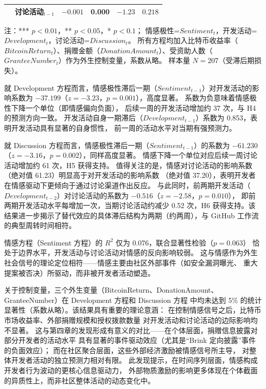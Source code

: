 \documentclass[
    type = master, %
    degree = professional,        %
    decl-page,  %
    twoside,                %
    fontset = fandol %
  ]{njuthesis}
\begin{document}
\begin{table}[htbp]
\begin{tabularx}{\textwidth}{p{3.2cm}p{3.2cm}XXXX}
                      & 讨论活动$_{t-1}$   & $-0.001$ & 0.000 & $-1.23$ & $0.218$ \\
        \bottomrule
    \end{tabularx}
    \begin{minipage}{\textwidth}
        \vspace{0.3em}
        \footnotesize 注：*** $p < 0.01$，** $p < 0.05$，* $p < 0.1$；
              情感极性=$Sentiment_t$，开发活动=$Development_t$，讨论活动=$Discussion_t$。
              所有方程均加入比特币收益率（$BitcoinReturn_t$）、捐赠金额（$DonationAmount_t$）、受资助人数（$GranteeNumber_t$）作为外生控制变量，系数从略。
              样本量 $N = 207$（受滞后期损失）。
    \end{minipage}
\end{table}

就 Development 方程而言，情感极性滞后一期（$Sentiment_{t-1}$）对开发活动的影响系数为
$-37.199$（$z = -3.23$，$p = 0.001$），高度显著。
系数为负意味着情感极性下降一个单位（即情感偏向负面），
后续一周的开发活动增加约 37 次，与 H4 的预测方向一致。
开发活动自身一期滞后（$Development_{t-1}$）系数为 0.853，表明开发活动具有显著的自身惯性，
前一周的活动水平对当期有强预测力。

就 Discussion 方程而言，情感极性滞后一期（$Sentiment_{t-1}$）的系数为
$-61.230$（$z = -3.16$，$p = 0.002$），同样高度显著。
情感下降一个单位对应后续一周讨论活动增加约 61 次，H5 获得支持。
值得关注的是，情感对讨论活动的影响系数（绝对值 61.23）明显高于对开发活动的影响系数
（绝对值 37.20），表明开发者在情感驱动下更倾向于通过讨论渠道作出反应。
与此同时，前两期开发活动（$Development_{t-2}$）对讨论活动的系数为
$-0.516$（$z = -2.58$，$p = 0.010$），
即前两期开发活动水平每增加一次，当期讨论活动约减少 0.52 次，H6 获得支持。该结果进一步揭示了替代效应的具体滞后结构为两期（约两周），与 GitHub 工作流的典型周转时间相符。

情感方程（Sentiment 方程）的 $R^2$ 仅为 0.076，联合显著性检验（$p = 0.063$）
恰处于边界水平，开发活动与讨论活动对情感的反向影响较弱。
这与情感作为外生社会信号的理论定位相符——情感主要由社区外部事件（如安全漏洞曝光、
重大提案被否决）所驱动，而非被开发者活动塑造。

关于控制变量，三个外生变量（BitcoinReturn、DonationAmount、GranteeNumber）在 Development 方程和 Discussion 方程
中均未达到 5\% 的统计显著性（系数从略）。该结果具有重要的理论意涵：
在控制情感信号之后，比特币市场收益率、外部捐赠规模和授权拨款数量
对开发活动和讨论活动的边际影响均不显著。
这与第四章的发现形成有意义的对比——在个体层面，捐赠信息披露对部分开发者的活动水平
具有显著的事件驱动效应（尤其是“Brink 定向披露”事件的负面效应）；
而在社区聚合层面，这些外部经济激励被情感信号所主导，
对整体开发者活动的独立预测力相对有限。
此发现提示，在时间序列层面，情感构成开发者行为波动的更核心信息驱动力，
外部物质激励的影响更多体现在个体截面的异质性上，而非社区整体活动的动态变化中。
\end{document}
